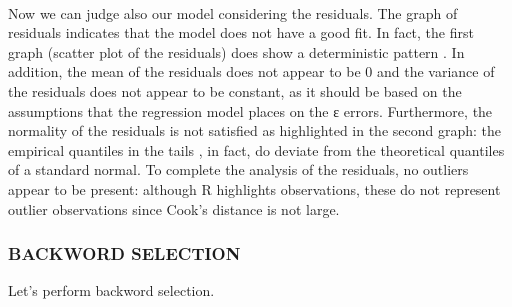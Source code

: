 \documentclass[11pt]{article}
\begin{document}
    
    \begin{center}
    \end{center}
    { \hspace*{\fill} \\}
    
    Now we can judge also our model considering the residuals. The graph of
residuals indicates that the model does not have a good fit. In fact,
the first graph (scatter plot of the residuals) does show a
deterministic pattern . In addition, the mean of the residuals does not
appear to be 0 and the variance of the residuals does not appear to be
constant, as it should be based on the assumptions that the regression
model places on the ε errors. Furthermore, the normality of the
residuals is not satisfied as highlighted in the second graph: the
empirical quantiles in the tails , in fact, do deviate from the
theoretical quantiles of a standard normal. To complete the analysis of
the residuals, no outliers appear to be present: although R highlights
observations, these do not represent outlier observations since Cook's
distance is not large.

    \hypertarget{backword-selection}{%
\subsubsection{BACKWORD SELECTION}\label{backword-selection}}

Let's perform backword selection.
\end{document}
